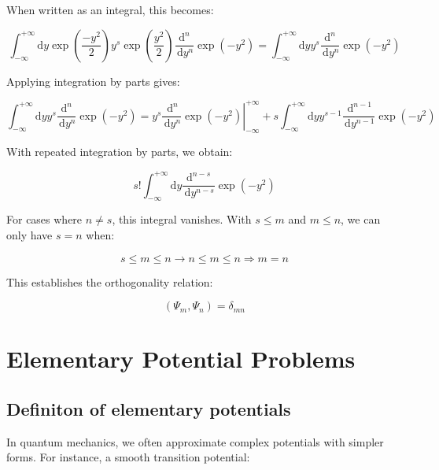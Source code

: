 \documentclass[italian]{HKNdocument}
\begin{document}
When written as an integral, this becomes:

\begin{equation}
\int_{-\infty}^{+\infty} \mathrm{d} y \exp \left(\frac{-y^{2}}{2}\right) y^{s} \exp \left(\frac{y^{2}}{2}\right) \frac{\mathrm{d}^{n}}{\, \mathrm{d} y^{n}} \exp \left(-y^{2}\right)=\int_{-\infty}^{+\infty} \mathrm{d} y y^{s} \frac{\mathrm{d}^{n}}{\, \mathrm{d} y^{n}} \exp \left(-y^{2}\right)
\end{equation}

Applying integration by parts gives:

\begin{equation}
\int_{-\infty}^{+\infty} \mathrm{d} y y^{s} \frac{\mathrm{d}^{n}}{\, \mathrm{d} y^{n}} \exp \left(-y^{2}\right)=\left.y^{s} \frac{\, \mathrm{d}^{n}}{\, \mathrm{d} y^{n}} \exp \left(-y^{2}\right)\right|_{-\infty} ^{+\infty}+s \int_{-\infty}^{+\infty} \mathrm{d} y y^{s-1} \frac{\, \mathrm{d}^{n-1}}{\, \mathrm{d} y^{n-1}} \exp \left(-y^{2}\right)
\end{equation}

With repeated integration by parts, we obtain:

\begin{equation}
s!\int_{-\infty}^{+\infty} \mathrm{d} y \frac{\mathrm{d}^{n-s}}{\, \mathrm{d} y^{n-s}} \exp \left(-y^{2}\right)
\end{equation}

For cases where $n \neq s$, this integral vanishes. With $s \leq m$ and $m \leq n$, we can only have $s = n$ when:

\begin{equation}
s \leq m \leq n \rightarrow n \leq m \leq n \Longrightarrow m=n
\end{equation}

This establishes the orthogonality relation:

\begin{equation}
\left(\Psi_{m}, \Psi_{n}\right)=\delta_{m n}
\end{equation}

\section{Elementary Potential Problems}
\subsection{Definiton of elementary potentials}

In quantum mechanics, we often approximate complex potentials with simpler forms. For instance, a smooth transition potential:
\end{document}
